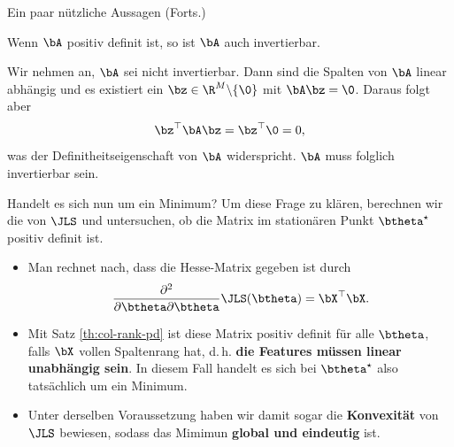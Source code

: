 \begin{frame}{Ein paar nützliche Aussagen (Forts.)}{}
	\begin{mytheo}
		Wenn $\bA$ positiv definit ist, so ist $\bA$ auch invertierbar.
	\end{mytheo}
	
	\begin{myproof}
		Wir nehmen an, $\bA$ sei nicht invertierbar. Dann sind die Spalten von $\bA$ linear abhängig und es existiert ein
		$\bz \in \R^M \backslash \{ \0 \}$ mit $\bA \bz = \0$.
		Daraus folgt aber $$\bz^\top \bA \bz = \bz^\top \0 = 0,$$ was der Definitheitseigenschaft von $\bA$ widerspricht.
		$\bA$ muss folglich invertierbar sein.
	\end{myproof}
\end{frame}


\begin{frame}{Handelt es sich nun um ein Minimum?}{}
	Um diese Frage zu klären, berechnen wir die  von $\JLS$ und untersuchen,
	ob die Matrix im stationären Punkt $\btheta^\star$ positiv definit ist.

	\begin{itemize}
		\item Man rechnet nach, dass die Hesse-Matrix gegeben ist durch
			$$\frac{\partial^2}{\partial \btheta \partial \btheta} \JLS(\btheta) = \bX^\top \bX.$$
		\item Mit Satz \ref{th:col-rank-pd} ist diese Matrix positiv definit für alle $\btheta$, falls $\bX$ vollen Spaltenrang hat,
			d.\,h. \textbf{die Features müssen linear unabhängig sein}.
			In diesem Fall handelt es sich bei $\btheta^\star$ also tatsächlich um ein Minimum.
		\item Unter derselben Voraussetzung haben wir damit sogar die \textbf{Konvexität} von $\JLS$ bewiesen,
			sodass das Mimimun \textbf{global und eindeutig} ist.
	\end{itemize}
\end{frame}


